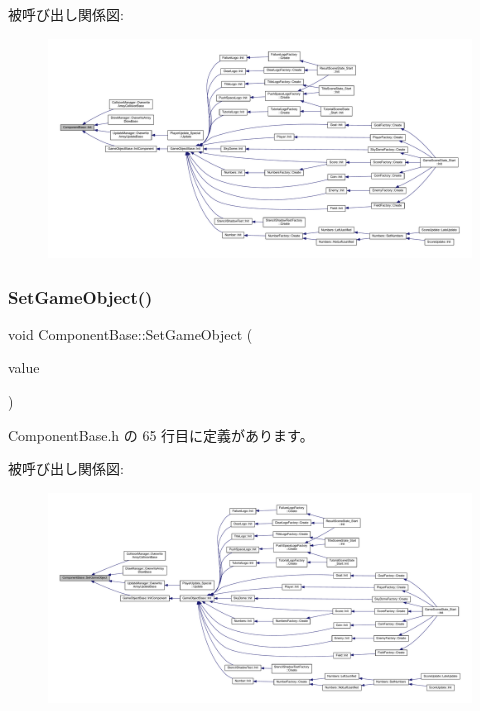 被呼び出し関係図\+:\nopagebreak
\begin{figure}[H]
\begin{center}
\leavevmode
\includegraphics[width=350pt]{class_component_base_a125939d6befe42f28886a6523e86b18b_icgraph}
\end{center}
\end{figure}
\mbox{\label{class_component_base_ac9fc08588e3d29caf8d692a3392fc7b0}} 
\subsubsection{\texorpdfstring{Set\+Game\+Object()}{SetGameObject()}}
{\footnotesize\ttfamily void Component\+Base\+::\+Set\+Game\+Object (\begin{DoxyParamCaption}\item[{\mbox{\hyperlink{class_game_object_base}{Game\+Object\+Base}} $\ast$}]{value }\end{DoxyParamCaption})\hspace{0.3cm}{\ttfamily [inline]}}



 Component\+Base.\+h の 65 行目に定義があります。

被呼び出し関係図\+:\nopagebreak
\begin{figure}[H]
\begin{center}
\leavevmode
\includegraphics[width=350pt]{class_component_base_ac9fc08588e3d29caf8d692a3392fc7b0_icgraph}
\end{center}
\end{figure}
\mbox{\label{class_component_base_a9f42beaf0383d6f629819579cab4de57}} 

